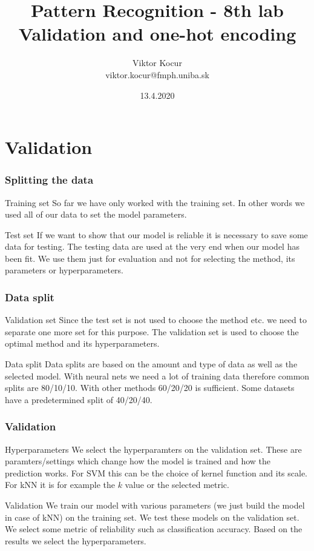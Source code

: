 \documentclass{beamer}
\title[Validácia, One-Hot]{Pattern Recognition - 8th lab \\ Validation and one-hot encoding}
\author[Viktor Kocur]{Viktor Kocur \\{\small viktor.kocur@fmph.uniba.sk}}
\institute{DAI FMFI UK}
\date{13.4.2020}
\begin{document}

\begin{frame}[plain]
  \titlepage  
\end{frame}

\section{Validation}
\begin{frame}
\frametitle{Splitting the data}
\begin{block}{Training set}
So far we have only worked with the training set. In other words we used all of our data to set the model parameters.
\end{block}

\begin{block}{Test set}
If we want to show that our model is reliable it is necessary to save some data for testing. The testing data are used at the very end when our model has been fit. We use them just for evaluation and not for selecting the method, its parameters or hyperparameters.
\end{block}
\end{frame}


\begin{frame}
\frametitle{Data split}
\begin{block}{Validation set}
Since the test set is not used to choose the method etc. we need to separate one more set for this purpose. The validation set is used to choose the optimal method and its hyperparameters.
\end{block}

\begin{block}{Data split}
Data splits are based on the amount and type of data as well as the selected model. With neural nets we need a lot of training data therefore common splits are 80/10/10. With other methods 60/20/20 is sufficient. Some datasets have a predetermined split of 40/20/40.
\end{block}
\end{frame}


\begin{frame}
\frametitle{Validation}
\begin{block}{Hyperparameters}
We select the hyperparamters on the validation set. These are paramters/settings which change how the model is trained and how the prediction works. For SVM this can be the choice of kernel function and its scale. For kNN it is for example the $k$ value or the selected metric.
\end{block}

\begin{block}{Validation}
We train our model with various parameters (we just build the model in case of kNN) on the training set. We test these models on the validation set. We select some metric of reliability such as classification accuracy. Based on the results we select the hyperparameters. 
\end{block}
\end{frame}
\end{document}
